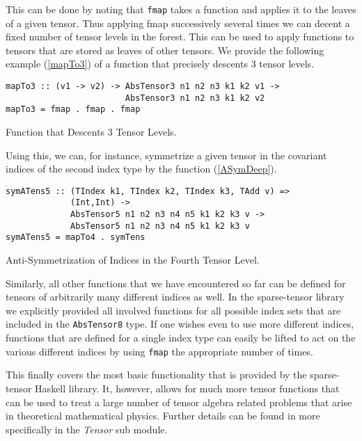 This can be done by noting that \texttt{fmap} takes a function and applies it to the leaves of a given tensor. Thus applying fmap successively several times we can decent a fixed number of tensor levels in the forest. This can be used to apply functions to tensors that are stored as leaves of other tensors. We provide the following example (\ref{mapTo3}) of a function that precisely descents $3$ tensor levels.
\begin{listing}[hbt!]
\begin{verbatim}
mapTo3 :: (v1 -> v2) -> AbsTensor3 n1 n2 n3 k1 k2 v1 -> 
                        AbsTensor3 n1 n2 n3 k1 k2 v2
mapTo3 = fmap . fmap . fmap
\end{verbatim}
\caption{Function that Descents 3 Tensor Levels.}\label{mapTo3}
\end{listing}
Using this, we can, for instance, symmetrize a given tensor in the covariant indices of the second index type by the function (\ref{ASymDeep}).
\begin{listing}[hbt!]
\begin{verbatim}
symATens5 :: (TIndex k1, TIndex k2, TIndex k3, TAdd v) =>
             (Int,Int) ->
             AbsTensor5 n1 n2 n3 n4 n5 k1 k2 k3 v ->
             AbsTensor5 n1 n2 n3 n4 n5 k1 k2 k3 v
symATens5 = mapTo4 . symTens
\end{verbatim} 
\caption{Anti-Symmetrization of Indices in the Fourth Tensor Level. }\label{ASymDeep}
\end{listing}
Similarly, all other functions that we have encountered so far can be defined for tensors of arbitrarily many different indices as well. In the sparse-tensor library we explicitly provided all involved functions for all possible index sets that are included in the \texttt{AbsTensor8} type. If one wishes even to use more different indices, functions that are defined for a single index type can easily be lifted to act on the various different indices by using \texttt{fmap} the appropriate number of times. 

This finally covers the most basic functionality that is provided by the sparse-tensor Haskell library. It, however, allows for much more tensor functions that can be used to treat a large number of tensor algebra related problems that arise in theoretical mathematical physics. 
Further details can be found in \cite{sparse-tensor} more specifically in the \textit{Tensor} sub module.

